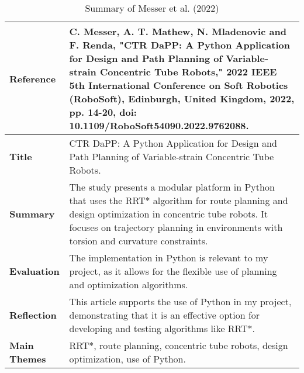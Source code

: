 \documentclass[a4paper,11pt]{report}
\begin{document}
\begin{table}[H]
    \centering
    \begin{tabular}{|p{3cm}|p{10cm}|}
        \hline
        \textbf{Reference} & C. Messer, A. T. Mathew, N. Mladenovic and F. Renda, "CTR DaPP: A Python Application for Design and Path Planning of Variable-strain Concentric Tube Robots," 2022 IEEE 5th International Conference on Soft Robotics (RoboSoft), Edinburgh, United Kingdom, 2022, pp. 14-20, doi: 10.1109/RoboSoft54090.2022.9762088. \\ \hline
        \textbf{Title} & CTR DaPP: A Python Application for Design and Path Planning of Variable-strain Concentric Tube Robots. \\ \hline
        \textbf{Summary} & The study presents a modular platform in Python that uses the RRT* algorithm for route planning and design optimization in concentric tube robots. It focuses on trajectory planning in environments with torsion and curvature constraints. \\ \hline
        \textbf{Evaluation} & The implementation in Python is relevant to my project, as it allows for the flexible use of planning and optimization algorithms. \\ \hline
        \textbf{Reflection} & This article supports the use of Python in my project, demonstrating that it is an effective option for developing and testing algorithms like RRT*. \\ \hline
        \textbf{Main Themes} & RRT*, route planning, concentric tube robots, design optimization, use of Python. \\ \hline
    \end{tabular}
    \caption{Summary of Messer et al. (2022)}
    \label{tab:messer2022}
\end{table}
\end{document}
